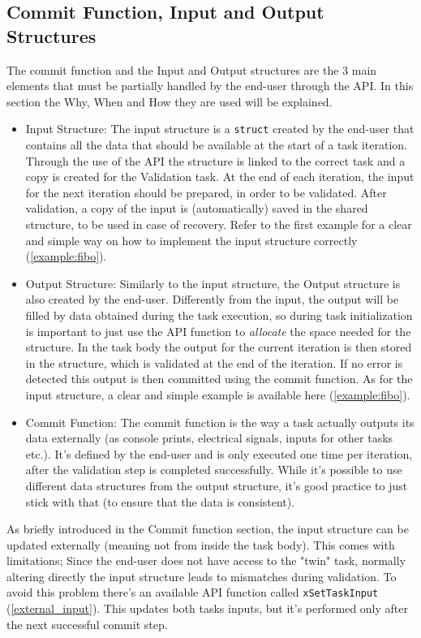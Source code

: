 \documentclass[a4paper, 12pt]{article}
\begin{document}
\begin{onehalfspace}
\subsection{Commit Function, Input and Output Structures} \label{section:IO structure and Commit}
The commit function and the Input and Output structures are the 3 main elements that must be partially handled by the end-user through the API. In this section the Why, When and How they are used will be explained.
\begin{itemize}
    \item \label{trm:input_structure}{Input Structure: The input structure is a \texttt{struct} created by the end-user that contains all the data that should be available at the start of a task iteration. Through the use of the API the structure is linked to the correct task and a copy is created for the Validation task. At the end of each iteration, the input for the next iteration should be prepared, in order to be validated. After validation, a copy of the input is (automatically) saved in the shared structure, to be used in case of recovery. Refer to the first example for a clear and simple way on how to implement the input structure correctly (\ref{example:fibo}).
    }
    \item \label{trm:output_structure}{Output Structure: Similarly to the input structure, the Output structure is also created by the end-user. Differently from the input, the output will be filled by data obtained during the task execution, so during task initialization is important to just use the API function to \textit{allocate} the space needed for the structure. In the task body the output for the current iteration is then stored in the structure, which is validated at the end of the iteration. If no error is detected this output is then committed using the commit function. As for the input structure, a clear and simple example is available here (\ref{example:fibo}).
    }
    \item \label{trm:commit_function}{Commit Function: The commit function is the way a task actually outputs its data externally (as console prints, electrical signals, inputs for other tasks etc.). It's defined by the end-user and is only executed one time per iteration, after the validation step is completed successfully. While it's possible to use different data structures  from the output structure, it's good practice to just stick with that (to ensure that the data is consistent).
    }
\end{itemize}
As briefly introduced in the Commit function section, the input structure can be updated externally (meaning not from inside the task body). This comes with limitations; Since the end-user does not have access to the "twin" task, normally altering directly the input structure leads to mismatches during validation. To avoid this problem there's an available API function called \texttt{xSetTaskInput} (\ref{external_input}). This updates both tasks inputs, but it's performed only after the next successful commit step.

\end{onehalfspace}
\end{document}
